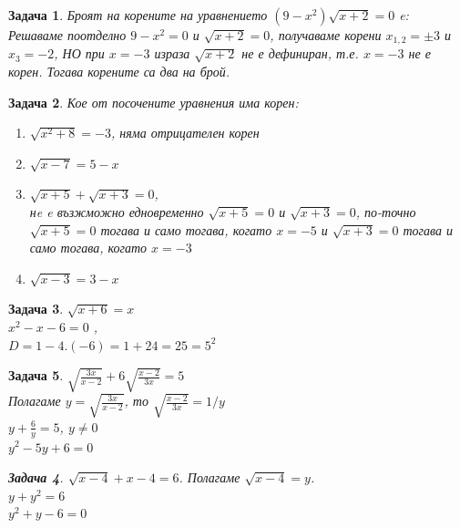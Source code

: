 \documentclass{article}
\newtheorem{problem}{Задача}
\begin{document}
	
	\begin{problem}
			Броят на корените на уравнението $(9-x^2
			)\sqrt{x+2} = 0$ e: \\
			Решаваме поотделно $9 - x^2 = 0 $ и $\sqrt{x+2} = 0 $, получаваме корени $x_{1,2} = \pm 3 $ и $x_3 = -2 $, НО при $ x = -3 $ израза $\sqrt{x+2} $ не е дефиниран, т.е. $x = -3 $ не е корен. Тогава корените са два на брой.
	\end{problem}
	
	\begin{problem}
		Кое от посочените уравнения има корен: 
	\begin{enumerate}
		\item $\sqrt{x^2 + 8} = -3   $, няма отрицателен корен
		\item $\sqrt{x-7} =  5 -x  $
		\item $\sqrt{x+5} + \sqrt{x+3} = 0 $, \\
		нe e възжможно едновременно $\sqrt{x+5} = 0$ и $ \sqrt{x+3} = 0 $, по-точно  $\sqrt{x+5} = 0$ тогава и само тогава, когато $x = -5 $ и $\sqrt{x+3} = 0$ тогава и само тогава, когато $x = -3 $
		\item $\sqrt{x-3} = 3-x $
	\end{enumerate}
	\end{problem}


\begin{problem}
	$\sqrt{x+6} = x$ \\
	$x^2 -x - 6 = 0 $  , \\
	$D = 1 - 4.(-6) = 1 +24 = 25 = 5^2   $
	
\end{problem}



\begin{problem}
	$\sqrt{\frac{3x}{x-2}} + 6 \sqrt{\frac{x-2}{3x}} = 5 $ \\
	Полагаме $y = \sqrt{\frac{3x}{x-2}}  $, то $\sqrt{\frac{x-2}{3x}} = 1/y $ \\
	$y + \frac{6}{y}= 5$, $y \neq 0 $ \\ 
	$y^2 - 5y + 6 = 0 $
	
	
	\begin{problem}
		$\sqrt{x - 4} + x - 4  = 6$. Полагаме $\sqrt{x - 4} = y$. \\
		$ y + y^2 = 6 $ \\
		$y^2  +y - 6 = 0$  \\
		$ $ 
	\end{problem}
	
	
\end{problem}
	
\end{document}
